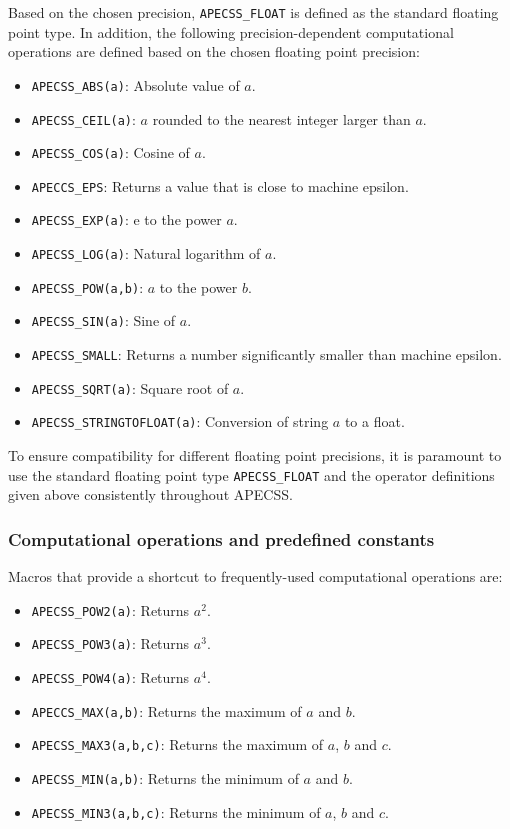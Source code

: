 Based on the chosen precision, {\tt APECSS\_FLOAT} is defined as the standard floating point type. In addition, the following precision-dependent computational operations are defined based on the chosen floating point precision:\vspace{-1em}
\begin{itemize}[noitemsep]
  \item {\tt APECSS\_ABS(a)}: Absolute value of $a$.
  \item {\tt APECSS\_CEIL(a)}: $a$ rounded to the nearest integer larger than $a$.
  \item {\tt APECSS\_COS(a)}: Cosine of $a$.
  \item {\tt APECCS\_EPS}: Returns a value that is close to machine epsilon.
  \item {\tt APECSS\_EXP(a)}: $\text{e}$ to the power $a$.
  \item {\tt APECSS\_LOG(a)}: Natural logarithm of $a$.
  \item {\tt APECSS\_POW(a,b)}: $a$ to the power $b$.
  \item {\tt APECSS\_SIN(a)}: Sine of $a$.
  \item {\tt APECSS\_SMALL}: Returns a number significantly smaller than machine epsilon.
  \item {\tt APECSS\_SQRT(a)}: Square root of $a$.
  \item {\tt APECSS\_STRINGTOFLOAT(a)}: Conversion of string $a$ to a float.
\end{itemize}
To ensure compatibility for different floating point precisions, it is paramount to use the standard floating point type {\tt APECSS\_FLOAT} and the operator definitions given above consistently throughout APECSS.

\subsubsection{Computational operations and predefined constants}

Macros that provide a shortcut to frequently-used computational operations are:\vspace{-1em}
\begin{itemize}[noitemsep]
  \item {\tt APECSS\_POW2(a)}: Returns $a^2$.
  \item {\tt APECSS\_POW3(a)}: Returns $a^3$.
  \item {\tt APECSS\_POW4(a)}: Returns $a^4$.
  \item {\tt APECCS\_MAX(a,b)}: Returns the maximum of $a$ and $b$.
  \item {\tt APECSS\_MAX3(a,b,c)}: Returns the maximum of $a$, $b$ and $c$.
  \item {\tt APECSS\_MIN(a,b)}: Returns the minimum of $a$ and $b$.
  \item {\tt APECSS\_MIN3(a,b,c)}: Returns the minimum of $a$, $b$ and $c$.
\end{itemize}


